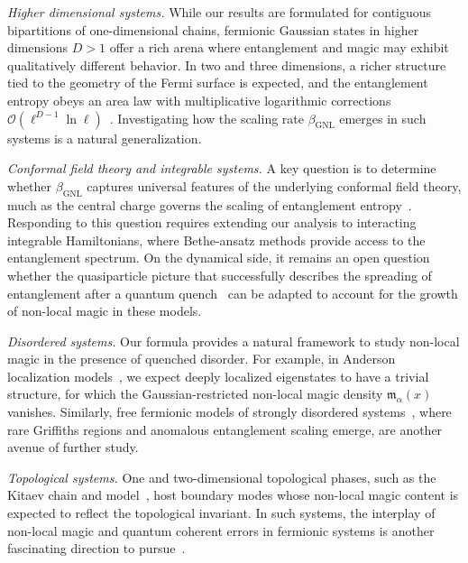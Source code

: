 \documentclass[prx,twocolumn,superscriptaddress,aps,10pt, frontmatterverbose, reprint,footinbib,longbibliography=true]{revtex4-2}
\newcommand{\RENYI}{\alpha}
\begin{document}
\emph{Higher dimensional systems.}
While our results are formulated for contiguous bipartitions of one-dimensional chains, fermionic Gaussian states in higher dimensions $D>1$ offer a rich arena where entanglement and magic may exhibit qualitatively different behavior. In two and three dimensions, a richer structure tied to the geometry of the Fermi surface is expected, and the entanglement entropy obeys an area law with multiplicative logarithmic corrections $\mathcal{O}(\ell^{D-1}\ln\ell)$~\cite{swingle2010entanglement}. 
Investigating how the scaling rate $\beta_\mathrm{GNL}$ emerges in such systems is a natural generalization.


\emph{Conformal field theory and integrable systems.}
A key question is to determine whether $\beta_{\mathrm{GNL}}$ captures universal features of the underlying conformal field theory, much as the central charge governs the scaling of entanglement entropy~\cite{Calabrese2004entanglement}.
Responding to this question requires extending our analysis to interacting integrable Hamiltonians, where Bethe-ansatz methods provide access to the entanglement spectrum.
On the dynamical side, it remains an open question whether the quasiparticle picture that successfully describes the spreading of entanglement after a quantum quench~\cite{Alba_2017,alba2019,Kudler_Flam_2021} can be adapted to account for the growth of non-local magic in these models.

\emph{Disordered systems.}
Our formula provides a natural framework to study non-local magic in the presence of quenched disorder. 
For example, in Anderson localization models~\cite{evers,sierant2020}, we expect deeply localized eigenstates to have a trivial structure, for which the Gaussian-restricted non-local magic density $\mathfrak{m}_\RENYI(x)$ vanishes. 
Similarly, free fermionic models of strongly disordered systems~\cite{IGLOI_2005,Monthus_2018,ruggiero2022}, where rare Griffiths regions and anomalous entanglement scaling emerge, are another avenue of further study.

\emph{Topological systems.}
One and two-dimensional topological phases, such as the Kitaev chain and model~\cite{Kitaev2001chain,Kitaev_2006}, host boundary modes whose non-local magic content is expected to reflect the topological invariant.
In such systems, the interplay of non-local magic and quantum coherent errors in fermionic systems is another fascinating direction to pursue~\cite{beri,gskb-t5ql}.
\end{document}
